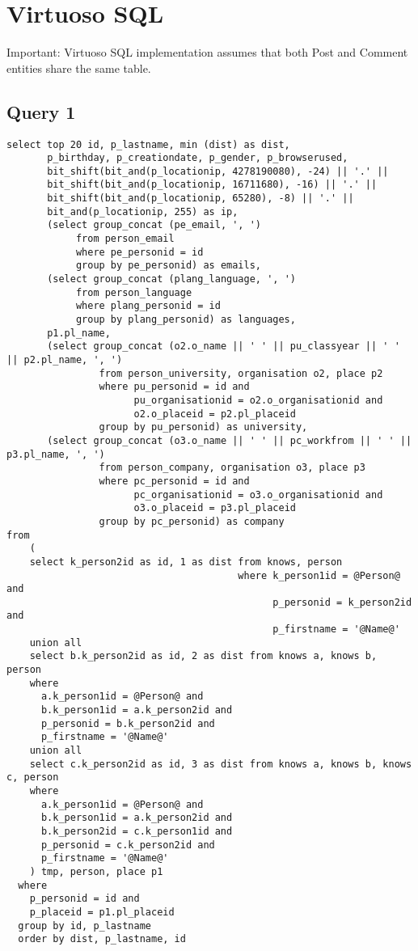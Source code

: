 \section{Virtuoso SQL}
Important: Virtuoso SQL implementation assumes that both Post and Comment entities share the same table.
\subsection{Query 1}
\begin{verbatim}
select top 20 id, p_lastname, min (dist) as dist,
       p_birthday, p_creationdate, p_gender, p_browserused,
       bit_shift(bit_and(p_locationip, 4278190080), -24) || '.' ||
       bit_shift(bit_and(p_locationip, 16711680), -16) || '.' ||
       bit_shift(bit_and(p_locationip, 65280), -8) || '.' ||
       bit_and(p_locationip, 255) as ip,
       (select group_concat (pe_email, ', ') 
            from person_email 
            where pe_personid = id 
            group by pe_personid) as emails,
       (select group_concat (plang_language, ', ') 
            from person_language
            where plang_personid = id
            group by plang_personid) as languages,
       p1.pl_name,
       (select group_concat (o2.o_name || ' ' || pu_classyear || ' ' || p2.pl_name, ', ') 
                from person_university, organisation o2, place p2  
                where pu_personid = id and 
                      pu_organisationid = o2.o_organisationid and
                      o2.o_placeid = p2.pl_placeid 
                group by pu_personid) as university,
       (select group_concat (o3.o_name || ' ' || pc_workfrom || ' ' || p3.pl_name, ', ') 
                from person_company, organisation o3, place p3
                where pc_personid = id and 
                      pc_organisationid = o3.o_organisationid and 
                      o3.o_placeid = p3.pl_placeid 
                group by pc_personid) as company
from
    (
    select k_person2id as id, 1 as dist from knows, person 
                                        where k_person1id = @Person@ and 
                                              p_personid = k_person2id and 
                                              p_firstname = '@Name@'
    union all
    select b.k_person2id as id, 2 as dist from knows a, knows b, person
    where
      a.k_person1id = @Person@ and 
      b.k_person1id = a.k_person2id and 
      p_personid = b.k_person2id and 
      p_firstname = '@Name@'
    union all
    select c.k_person2id as id, 3 as dist from knows a, knows b, knows c, person
    where
      a.k_person1id = @Person@ and 
      b.k_person1id = a.k_person2id and 
      b.k_person2id = c.k_person1id and 
      p_personid = c.k_person2id and
      p_firstname = '@Name@'
    ) tmp, person, place p1
  where
    p_personid = id and
    p_placeid = p1.pl_placeid
  group by id, p_lastname
  order by dist, p_lastname, id
\end{verbatim}
 

